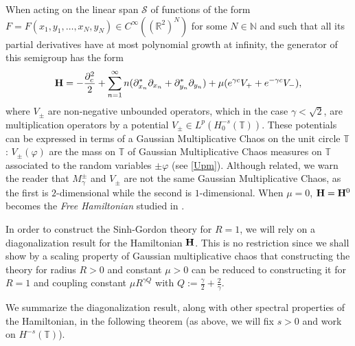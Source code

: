 \documentclass[11pt]{amsart}
\numberwithin{equation}{section}
\theoremstyle{definition}
\newcommand{\R}{\mathbb{R}}
\newcommand{\N}{\mathbb{N}}
\newcommand{\pl}{\partial}
\newcommand{\mc}{\mathcal}
\def\T{\mathbb{T}}
\begin{document}
When acting on  the linear span $\mc{S}$ of functions of the form $F = F(x_1,y_1, \dots, x_N,y_N) \in C^\infty((\R^2)^N)$ for some $N \in \N$ and such that all its partial derivatives have at most polynomial growth at infinity, the generator of this semigroup has the form 
\begin{equation}\label{intro_H} 
{\bf H}=-\frac{\pl_c^2}{2}+\sum_{n=1}^\infty n(\pl_{x_n}^*\pl_{x_n}+\pl_{y_n}^*\pl_{y_n})+\mu (e^{\gamma c}V_+ +e^{-\gamma c}V_-),
\end{equation}
where $V_\pm$ are non-negative unbounded operators, which in the case $\gamma<\sqrt{2}$, are multiplication operators by a potential $V_\pm \in L^p(H^{-s}_0(\T))$. These potentials can be expressed in terms of a Gaussian Multiplicative Chaos on the unit circle $\T$: $V_\pm(\varphi)$ are the mass on $\T$ of  Gaussian Multiplicative Chaos measures on $\T$ associated to the random variables $\pm \varphi$ (see \eqref{Upm}). 
Although related, we warn the reader that $M_\gamma^\pm$ and $V_\pm$ are not the same Gaussian Multiplicative Chaos, as the first is $2$-dimensional while the second is $1$-dimensional.
When $\mu=0$, ${\bf H}={\bf H}^0$ becomes the \emph{Free Hamiltonian} studied in \cite[Sections 4.2 \& 4.3]{GKRV}.



In order to construct the Sinh-Gordon theory for $R= 1$, we will rely on a diagonalization result for the Hamiltonian ${\bf H}$. 
This is no restriction since
we shall show by a scaling property of Gaussian multiplicative chaos that constructing the theory for radius $R>0$ and constant $\mu>0$ 
can be reduced to constructing it for $R=1$ and coupling constant $\mu R^{\gamma Q}$ with $Q:=\frac{\gamma}{2}+\frac{2}{\gamma}$. 

We summarize the diagonalization result, along with other spectral properties of the Hamiltonian, in the following theorem (as above, we will fix $s>0$ and work on $H^{-s}(\T)$).
\end{document}
